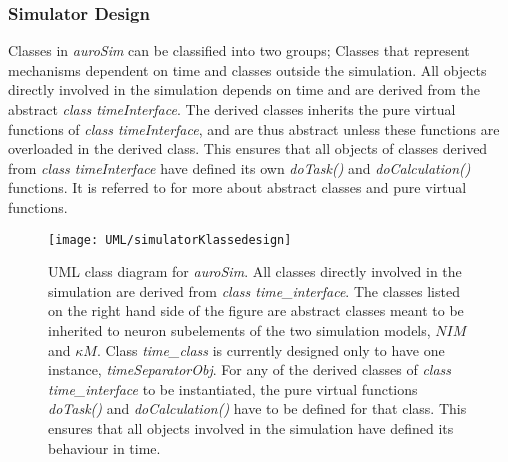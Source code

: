  

		\subsubsection{Simulator Design} 	%
			Classes in \emph{auroSim} can be classified into two groups; Classes that represent mechanisms dependent on time and classes outside the simulation.
			All objects directly involved in the simulation depends on time and are derived from the abstract \emph{class timeInterface}. %
			The derived classes inherits the pure virtual functions of \emph{class timeInterface}, and are thus abstract unless these functions are overloaded in the derived class.
			This ensures that all objects of classes derived from \emph{class timeInterface} have defined its own \emph{doTask()} and \emph{doCalculation()} functions.
			It is referred to \cite{Stroustrup2000KAP12} for more about abstract classes and pure virtual functions. 



			\begin{figure}[htbp!]
				\centering
				\texttt{[image: UML/simulatorKlassedesign]}
				\caption[UML class diagram of \emph{auroSim}, the neuron simulator designed to compare $NIM$ and $\kappa M$.]{
						UML class diagram for \emph{auroSim}. %
						All classes directly involved in the simulation are derived from \emph{class time\_interface}.
						The classes listed on the right hand side of the figure are abstract classes meant to be inherited to neuron subelements of the two simulation 
							models, $NIM$ and $\kappa M$. %
						Class \emph{time\_class} is currently designed only to have one instance, \emph{timeSeparatorObj}. %
						For any of the derived classes of \emph{class time\_interface} to be instantiated, the pure virtual functions \emph{doTask()} and \emph{doCalculation()} have to be defined for that class.
						This ensures that all objects involved in the simulation have defined its behaviour in time.
						}
				\label{figUMLclassDiagramOfSimulator}
			\end{figure}


